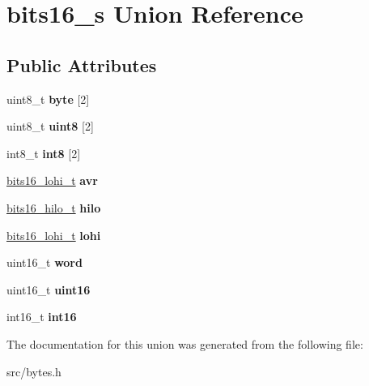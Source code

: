 \hypertarget{unionbits16__s}{}\section{bits16\+\_\+s Union Reference}
\label{unionbits16__s}
\subsection*{Public Attributes}
\begin{DoxyCompactItemize}
\item 
uint8\+\_\+t {\bfseries byte} \mbox{[}2\mbox{]}\hypertarget{unionbits16__s_a8e70ab734bd08c67b789e0ffb1d67892}{}\label{unionbits16__s_a8e70ab734bd08c67b789e0ffb1d67892}

\item 
uint8\+\_\+t {\bfseries uint8} \mbox{[}2\mbox{]}\hypertarget{unionbits16__s_aa05d8486a82ce525c07f162c2a5d1534}{}\label{unionbits16__s_aa05d8486a82ce525c07f162c2a5d1534}

\item 
int8\+\_\+t {\bfseries int8} \mbox{[}2\mbox{]}\hypertarget{unionbits16__s_a8f4ee6dd238c821c99a5766ef0bae0e4}{}\label{unionbits16__s_a8f4ee6dd238c821c99a5766ef0bae0e4}

\item 
\hyperlink{structbits16__lohi__s}{bits16\+\_\+lohi\+\_\+t} {\bfseries avr}\hypertarget{unionbits16__s_af0ebecfcbdd064f43b10f70e49b133bd}{}\label{unionbits16__s_af0ebecfcbdd064f43b10f70e49b133bd}

\item 
\hyperlink{structbits16__hilo__s}{bits16\+\_\+hilo\+\_\+t} {\bfseries hilo}\hypertarget{unionbits16__s_a9a297f75a8f79930db07a7a458f3a4c4}{}\label{unionbits16__s_a9a297f75a8f79930db07a7a458f3a4c4}

\item 
\hyperlink{structbits16__lohi__s}{bits16\+\_\+lohi\+\_\+t} {\bfseries lohi}\hypertarget{unionbits16__s_abf1a2610c051d39886f4e1ea67b20502}{}\label{unionbits16__s_abf1a2610c051d39886f4e1ea67b20502}

\item 
uint16\+\_\+t {\bfseries word}\hypertarget{unionbits16__s_affde397ef273ced95c39dcdad4b27c98}{}\label{unionbits16__s_affde397ef273ced95c39dcdad4b27c98}

\item 
uint16\+\_\+t {\bfseries uint16}\hypertarget{unionbits16__s_abf83c4c027232cd129c9c9d4f8dd0ce6}{}\label{unionbits16__s_abf83c4c027232cd129c9c9d4f8dd0ce6}

\item 
int16\+\_\+t {\bfseries int16}\hypertarget{unionbits16__s_a8be8d70895f37f5e17c483a12b98363b}{}\label{unionbits16__s_a8be8d70895f37f5e17c483a12b98363b}

\end{DoxyCompactItemize}


The documentation for this union was generated from the following file\+:\begin{DoxyCompactItemize}
\item 
src/bytes.\+h\end{DoxyCompactItemize}
